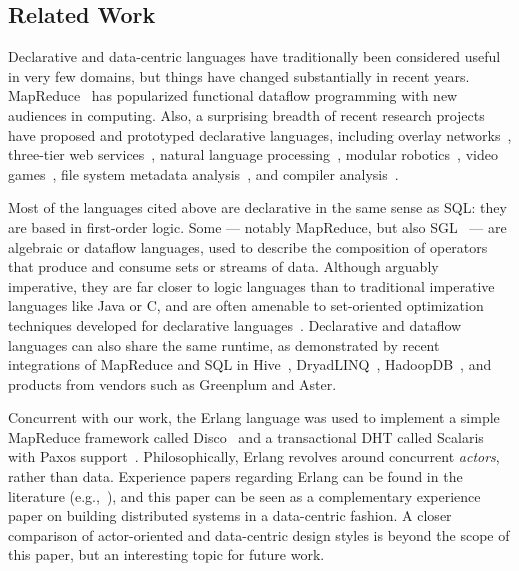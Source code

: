 \subsection{Related Work}
\label{sec:relwork}
Declarative and data-centric languages have traditionally been considered useful
in very few domains, but things have changed substantially in recent years.
MapReduce~\cite{mapreduce-osdi} has popularized functional dataflow programming
with new audiences in computing.  Also, a surprising breadth of recent research
projects have proposed and prototyped declarative languages, including overlay
networks~\cite{p2}, three-tier web services~\cite{hilda}, natural language
processing~\cite{dyna}, modular robotics~\cite{meld}, video
games~\cite{cornellgames}, file system metadata analysis~\cite{wiscfsck}, and
compiler analysis~\cite{bddbddb}.

Most of the languages cited above are declarative in the same sense as SQL: they are based in first-order logic.
Some --- notably MapReduce, but also SGL~\cite{cornellgames} --- are
algebraic or dataflow languages, used to describe the
composition of operators that produce and consume sets
or streams of data.  Although arguably imperative, they are far closer
to logic languages than to traditional imperative languages like Java
or C, and are often amenable to set-oriented optimization techniques developed for declarative languages~\cite{cornellgames}.
Declarative and dataflow languages can also share the same runtime, as
demonstrated by recent integrations of MapReduce and SQL
in Hive~\cite{hive}, DryadLINQ~\cite{DryadLINQ},
HadoopDB~\cite{hadoopdb}, and products from vendors such as Greenplum and Aster.

Concurrent with our work, the Erlang language was used to implement a simple MapReduce framework called Disco~\cite{disco} and a transactional DHT called Scalaris with Paxos support~\cite{scalaris}.
Philosophically, Erlang revolves around concurrent {\em actors}, rather than
data.  Experience papers regarding Erlang can be found in the literature (e.g.,~\cite{armistice}), and this paper can be seen as a complementary experience paper on building distributed systems in a data-centric fashion.  A closer comparison of actor-oriented and data-centric design styles is beyond the scope of this paper, but an interesting topic for future work.

